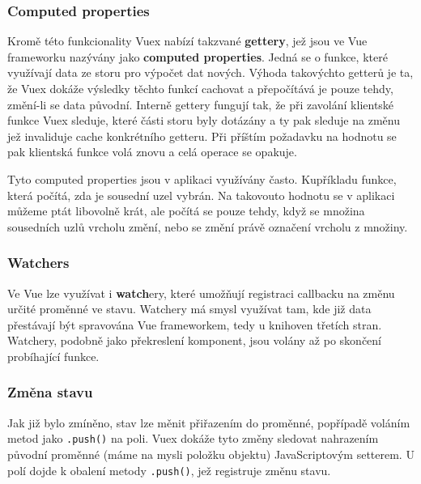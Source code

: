 \subsubsection{Computed properties}

Kromě této funkcionality Vuex nabízí takzvané \textbf{gettery}, jež jsou ve Vue frameworku nazývány jako \textbf{computed properties}. Jedná se o funkce, které využívají data ze storu pro výpočet dat nových. Výhoda takovýchto getterů je ta, že Vuex dokáže výsledky těchto funkcí cachovat a přepočítává je pouze tehdy, změní-li se data původní. Interně gettery fungují tak, že při zavolání klientské funkce Vuex sleduje, které části storu byly dotázány a ty pak sleduje na změnu jež invaliduje cache konkrétního getteru. Při příštím požadavku na hodnotu se pak klientská funkce volá znovu a celá operace se opakuje.

Tyto computed properties jsou v aplikaci využívány často. Kupříkladu funkce, která počítá, zda je sousední uzel vybrán. Na takovouto hodnotu se v aplikaci můžeme ptát libovolně krát, ale počítá se pouze tehdy, když se množina sousedních uzlů vrcholu změní, nebo se změní právě označení vrcholu z množiny.

\subsubsection{Watchers}

Ve Vue lze využívat i \textbf{watch}ery, které umožňují registraci callbacku na změnu určité proměnné ve stavu. Watchery má smysl využívat tam, kde již data přestávají být spravována Vue frameworkem, tedy u knihoven třetích stran. Watchery, podobně jako překreslení komponent, jsou volány až po skončení probíhající funkce.

\subsubsection{Změna stavu}

Jak již bylo zmíněno, stav lze měnit přiřazením do proměnné, popřípadě voláním metod jako \texttt{.push()} na poli. Vuex dokáže tyto změny sledovat nahrazením původní proměnné (máme na mysli položku objektu) JavaScriptovým setterem. U polí dojde k obalení metody \texttt{.push()}, jež registruje změnu stavu.

